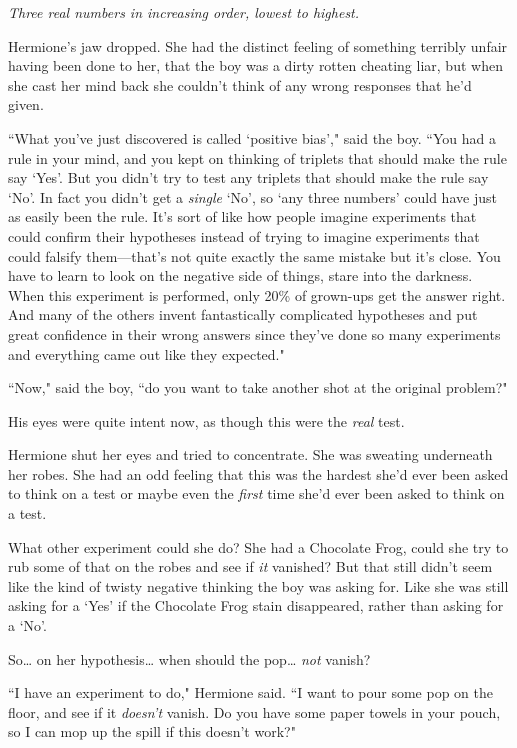 \emph{Three real numbers in increasing order, lowest to highest.}

Hermione's jaw dropped. She had the distinct feeling of something terribly unfair having been done to her, that the boy was a dirty rotten cheating liar, but when she cast her mind back she couldn't think of any wrong responses that he'd given.

``What you've just discovered is called `positive bias'," said the boy. ``You had a rule in your mind, and you kept on thinking of triplets that should make the rule say `Yes'. But you didn't try to test any triplets that should make the rule say `No'. In fact you didn't get a \emph{single} `No', so `any three numbers' could have just as easily been the rule. It's sort of like how people imagine experiments that could confirm their hypotheses instead of trying to imagine experiments that could falsify them—that's not quite exactly the same mistake but it's close. You have to learn to look on the negative side of things, stare into the darkness. When this experiment is performed, only 20\% of grown-ups get the answer right. And many of the others invent fantastically complicated hypotheses and put great confidence in their wrong answers since they've done so many experiments and everything came out like they expected."

``Now," said the boy, ``do you want to take another shot at the original problem?"

His eyes were quite intent now, as though this were the \emph{real} test.

Hermione shut her eyes and tried to concentrate. She was sweating underneath her robes. She had an odd feeling that this was the hardest she'd ever been asked to think on a test or maybe even the \emph{first} time she'd ever been asked to think on a test.

What other experiment could she do? She had a Chocolate Frog, could she try to rub some of that on the robes and see if \emph{it} vanished? But that still didn't seem like the kind of twisty negative thinking the boy was asking for. Like she was still asking for a `Yes' if the Chocolate Frog stain disappeared, rather than asking for a `No'.

So{\ldots} on her hypothesis{\ldots} when should the pop{\ldots} \emph{not} vanish?

``I have an experiment to do," Hermione said. ``I want to pour some pop on the floor, and see if it \emph{doesn't} vanish. Do you have some paper towels in your pouch, so I can mop up the spill if this doesn't work?"

